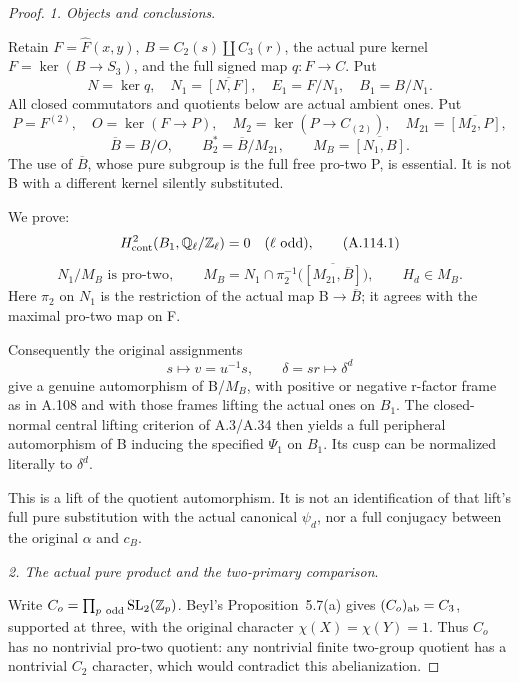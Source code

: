 \begin{proof}
\medskip\noindent\emph{1. Objects and conclusions}.

Retain \(F=\widehat F(x,y)\), \(B=C_2(s)\amalg C_3(r)\), the actual pure kernel \(F=\ker(B\to S_3)\), and the full signed map \(q:F\to C\). Put
\[
N=\ker q,\quad N_1=\overline{[N,F]},\quad
E_1=F/N_1,\quad B_1=B/N_1.
\]
All closed commutators and quotients below are actual ambient ones. Put
\[
P=F^{(2)},\quad O=\ker(F\to P),\quad
M_2=\ker(P\to C_{(2)}),\quad M_{21}=\overline{[M_2,P]},
\]
\[
\overline B=B/O,\qquad B_2^*=\overline B/M_{21},\qquad
M_B=\overline{[N_1,B]}.
\]
The use of \(\overline B\), whose pure subgroup is the full free pro-two P, is essential. It is not B with a different kernel silently substituted.

We prove:
\[
H^2_{\rm cont}(B_1,\mathbb Q_\ell/\mathbb Z_\ell)=0
\quad(\ell\text{ odd}),                                      \tag{A.114.1}
\]
\[
N_1/M_B\text{ is pro-two},\qquad
M_B=N_1\cap\pi_2^{-1}\bigl(\overline{[M_{21},\overline B]}\bigr),
\qquad H_d\in M_B.                                            \tag{A.114.2}
\]
Here \(\pi_2\) on \(N_1\) is the restriction of the actual map B\(\to\)\(\overline B\); it agrees with the maximal pro-two map on F.

Consequently the original assignments
\[
s\mapsto v=u^{-1}s,\qquad \delta=sr\mapsto\delta^d
\]
give a genuine automorphism of B/\(M_B\), with positive or negative r-factor frame as in A.108 and with those frames lifting the actual ones on \(B_1\). The closed-normal central lifting criterion of A.3/A.34 then yields a full peripheral automorphism of B inducing the specified \(\Psi_1\) on \(B_1\). Its cusp can be normalized literally to \(\delta^d\).

This is a lift of the quotient automorphism. It is not an identification of that lift's full pure substitution with the actual canonical \(\psi_d\), nor a full conjugacy between the original \(\alpha\) and \(c_B\).

\medskip\noindent\emph{2. The actual pure product and the two-primary comparison}.

Write \(C_o=\prod_{p\ {\rm odd}}\operatorname{SL}_2(\mathbb Z_p)\).
Beyl's Proposition~5.7(a)\citep[Proposition~5.7]{A_Beyl1986} gives \((C_o)_{\rm ab}=C_3\), supported at three, with the original character \(\chi(X)=\chi(Y)=1\). Thus \(C_o\) has no nontrivial pro-two quotient: any nontrivial finite two-group quotient has a nontrivial \(C_2\) character, which would contradict this abelianization.


\end{proof}
